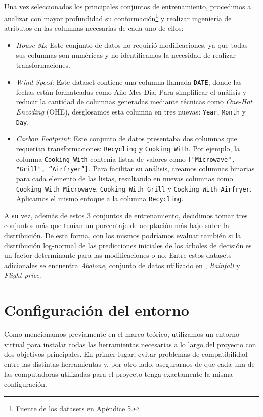 Una vez seleccionados los principales conjuntos de entrenamiento, procedimos a analizar con mayor profundidad su conformación\footnote{Fuente de los datasets en \hyperref[appendix5]{Apéndice 5}.} y realizar ingeniería de atributos en las columnas necesarias de cada uno de ellos:

\begin{itemize}
    \item \textit{House 8L}: Este conjunto de datos no requirió modificaciones, ya que todas sus columnas son numéricas y no identificamos la necesidad de realizar transformaciones.
    \item \textit{Wind Speed}: Este dataset contiene una columna llamada \texttt{DATE}, donde las fechas están formateadas como Año-Mes-Día. Para simplificar el análisis y reducir la cantidad de columnas generadas mediante técnicas como \textit{One-Hot Encoding} (OHE), desglosamos esta columna en tres nuevas: \texttt{Year}, \texttt{Month} y \texttt{Day}.
    \item \textit{Carbon Footprint}: Este conjunto de datos presentaba dos columnas que requerían transformaciones: \texttt{Recycling} y \texttt{Cooking\_With}. Por ejemplo, la columna \texttt{Cooking\_With} contenía listas de valores como \texttt{["Microwave", "Grill", ``Airfryer'']}. Para facilitar su análisis, creamos columnas binarias para cada elemento de las listas, resultando en nuevas columnas como \texttt{Cooking\_With\_Microwave}, \texttt{Cooking\_With\_Grill} y \texttt{Cooking\_With\_Airfryer}. Aplicamos el mismo enfoque a la columna \texttt{Recycling}.
\end{itemize}

A su vez, además de estos 3 conjuntos de entrenamiento, decidimos tomar tres conjuntos más que tenían un porcentaje de aceptación más bajo sobre la distribución. De esta forma, con los mismos podríamos evaluar también si la distribución log-normal de las predicciones iniciales de los árboles de decisión es un factor determinante para las modificaciones o no. Entre estos datasets adicionales se encuentra \textit{Abalone}, conjunto de datos utilizado en \cite{breimanRF}, \textit{Rainfall} y \textit{Flight price}.


\section{Configuración del entorno}
\label{confi-entorno}

Como mencionamos previamente en el marco teórico, utilizamos un entorno virtual para instalar todas las herramientas necesarias a lo largo del proyecto con dos objetivos principales. En primer lugar, evitar problemas de compatibilidad entre las distintas herramientas y, por otro lado, asegurarnos de que cada una de las computadoras utilizadas para el proyecto tenga exactamente la misma configuración.

